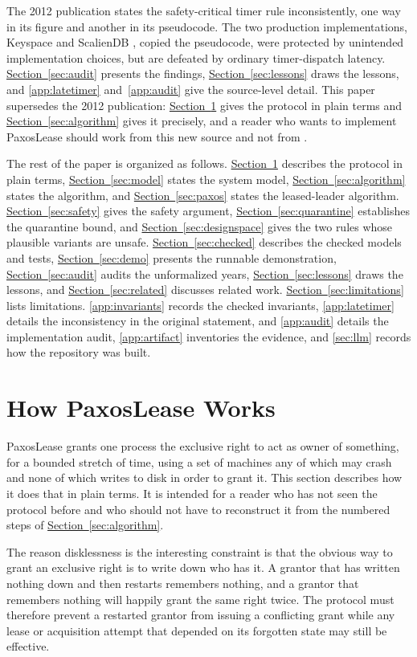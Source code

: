 \documentclass[final,5p,times,twocolumn,number]{elsarticle}
\newcommand{\secref}[1]{\hyperref[#1]{Section~\ref*{#1}}}
\begin{document}
The 2012 publication states the safety-critical timer rule inconsistently, one way in its figure and another in its pseudocode.  The two production implementations, Keyspace \cite{ref14} and ScalienDB \cite{ref15}, copied the pseudocode, were protected by unintended implementation choices, but are defeated by ordinary timer-dispatch latency.  \secref{sec:audit} presents the findings, \secref{sec:lessons} draws the lessons, and \ref{app:latetimer} and~\ref{app:audit} give the source-level detail.  This paper supersedes the 2012 publication: \secref{sec:outline} gives the protocol in plain terms and \secref{sec:algorithm} gives it precisely, and a reader who wants to implement PaxosLease should work from this new source and not from \cite{ref1}.

The rest of the paper is organized as follows.  \secref{sec:outline} describes the protocol in plain terms, \secref{sec:model} states the system model, \secref{sec:algorithm} states the algorithm, and \secref{sec:paxos} states the leased-leader algorithm.  \secref{sec:safety} gives the safety argument, \secref{sec:quarantine} establishes the quarantine bound, and \secref{sec:designspace} gives the two rules whose plausible variants are unsafe.  \secref{sec:checked} describes the checked models and tests, \secref{sec:demo} presents the runnable demonstration, \secref{sec:audit} audits the unformalized years, \secref{sec:lessons} draws the lessons, and \secref{sec:related} discusses related work.  \secref{sec:limitations} lists limitations.  \ref{app:invariants} records the checked invariants, \ref{app:latetimer} details the inconsistency in the original statement, and \ref{app:audit} details the implementation audit, \ref{app:artifact} inventories the evidence, and \ref{sec:llm} records how the repository was built.

\section{How PaxosLease Works}\label{sec:outline}

PaxosLease grants one process the exclusive right to act as owner of something, for a bounded stretch of time, using a set of machines any of which may crash and none of which writes to disk in order to grant it.  This section describes how it does that in plain terms.  It is intended for a reader who has not seen the protocol before and who should not have to reconstruct it from the numbered steps of \secref{sec:algorithm}.

The reason disklessness is the interesting constraint is that the obvious way to grant an exclusive right is to write down who has it.  A grantor that has written nothing down and then restarts remembers nothing, and a grantor that remembers nothing will happily grant the same right twice.  The protocol must therefore prevent a restarted grantor from issuing a conflicting grant while any lease or acquisition attempt that depended on its forgotten state may still be effective.
\end{document}
